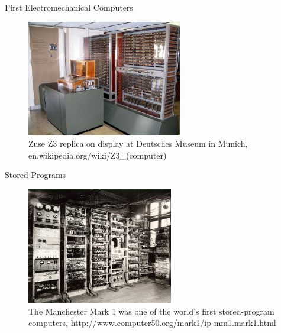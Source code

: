 \documentclass[xcolor=x11names,compress]{beamer}
\renewcommand{\(}{\begin{columns}}
\renewcommand{\)}{\end{columns}}
\newcommand{\<}[1]{\begin{column}{#1}}
\renewcommand{\>}{\end{column}}
\begin{document}
\begin{frame}{First Electromechanical Computers}

\begin{figure}
\includegraphics[height=2in,clip]{Z3DeutschesMuseum}
\caption{Zuse Z3 replica on display at Deutsches Museum in Munich, en.wikipedia.org/wiki/Z3\_(computer)}
\end{figure}

\end{frame}

\begin{frame}{Stored Programs}

\begin{figure}
\includegraphics[height=2in,clip]{ManchesterMark1}
\caption{The Manchester Mark 1 was one of the world's first stored-program computers, http://www.computer50.org/mark1/ip-mm1.mark1.html}
\end{figure}

\end{frame}
\end{document}

